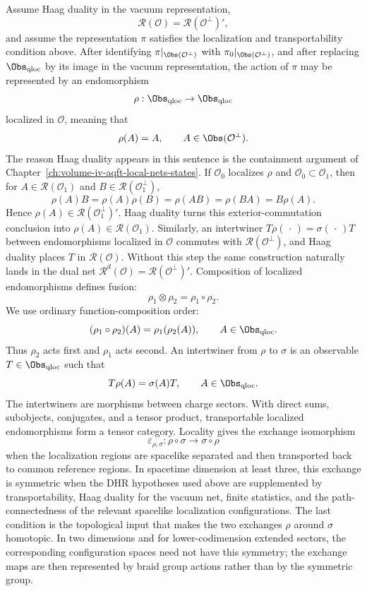 Assume Haag duality in the vacuum representation,
\[
  \mathcal R(\mathcal O)=\mathcal R(\mathcal O^\perp)' ,
\]
and assume the representation \(\pi\) satisfies the localization and
transportability condition above.  After identifying
\(\pi|_{\Obs(\mathcal O^\perp)}\) with
\(\pi_0|_{\Obs(\mathcal O^\perp)}\), and after replacing
\(\Obs_{\rm qloc}\) by its image in the vacuum representation, the action of
\(\pi\) may be represented by an endomorphism
\[
  \rho:\Obs_{\rm qloc}\to\Obs_{\rm qloc}
\]
localized in \(\mathcal O\), meaning that
\[
  \rho(A)=A,\qquad A\in\Obs(\mathcal O^\perp).
\]
The reason Haag duality appears in this sentence is the containment argument
of Chapter~\ref{ch:volume-iv-aqft-local-nets-states}.  If
\(\mathcal O_0\) localizes \(\rho\) and
\(\mathcal O_0\subset\mathcal O_1\), then for
\(A\in\mathcal R(\mathcal O_1)\) and
\(B\in\mathcal R(\mathcal O_1^\perp)\),
\[
  \rho(A)B
  =
  \rho(A)\rho(B)
  =
  \rho(AB)
  =
  \rho(BA)
  =
  B\rho(A).
\]
Hence \(\rho(A)\in\mathcal R(\mathcal O_1^\perp)'\).  Haag duality turns this
exterior-commutation conclusion into
\(\rho(A)\in\mathcal R(\mathcal O_1)\).  Similarly, an intertwiner
\(T\rho(\,\cdot\,)=\sigma(\,\cdot\,)T\) between endomorphisms localized in
\(\mathcal O\) commutes with \(\mathcal R(\mathcal O^\perp)\), and Haag
duality places \(T\) in \(\mathcal R(\mathcal O)\).  Without this step the
same construction naturally lands in the dual net
\(\mathcal R^d(\mathcal O)=\mathcal R(\mathcal O^\perp)'\).
Composition of localized endomorphisms defines fusion:
\[
  \rho_1\otimes\rho_2=\rho_1\circ\rho_2 .
\]
We use ordinary function-composition order:
\[
  (\rho_1\circ\rho_2)(A)=\rho_1(\rho_2(A)),
  \qquad A\in\Obs_{\rm qloc}.
\]
Thus \(\rho_2\) acts first and \(\rho_1\) acts second.
An intertwiner from \(\rho\) to \(\sigma\) is an observable
\(T\in\Obs_{\rm qloc}\) such
that
\[
  T\rho(A)=\sigma(A)T,\qquad A\in\Obs_{\rm qloc}.
\]
The intertwiners are morphisms between charge sectors.  With direct sums,
subobjects, conjugates, and a tensor product, transportable localized
endomorphisms form a tensor category.  Locality gives the exchange
isomorphism
\[
  \varepsilon_{\rho,\sigma}:\rho\circ\sigma\to\sigma\circ\rho
\]
when the localization regions are spacelike separated and then transported
back to common reference regions.  In spacetime dimension at least three, this
exchange is symmetric when the DHR hypotheses used above are supplemented by
transportability, Haag duality for the vacuum net, finite statistics, and the
path-connectedness of the relevant spacelike localization configurations.
The last condition is the topological input that makes the two exchanges
\(\rho\) around \(\sigma\) homotopic.  In two dimensions and for
lower-codimension extended sectors, the corresponding configuration spaces
need not have this symmetry; the exchange maps are then represented by braid
group actions rather than by the symmetric group.

